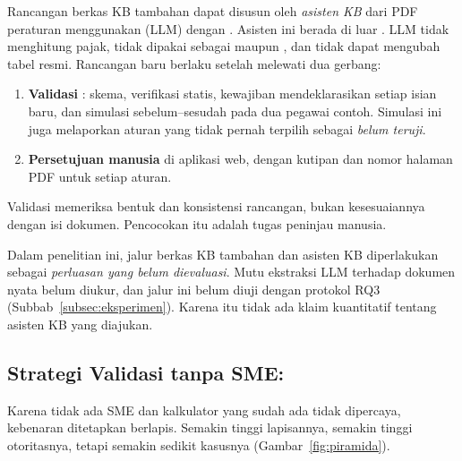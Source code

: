Rancangan berkas KB tambahan dapat disusun oleh \emph{asisten KB} dari PDF peraturan menggunakan  (LLM) dengan . Asisten ini berada di luar . LLM tidak menghitung pajak, tidak dipakai sebagai  maupun , dan tidak dapat mengubah tabel resmi. Rancangan baru berlaku setelah melewati dua gerbang:
\begin{enumerate}[leftmargin=*,nosep]
  \item \textbf{Validasi }: skema, verifikasi statis, kewajiban mendeklarasikan setiap isian baru, dan simulasi sebelum--sesudah pada dua pegawai contoh. Simulasi ini juga melaporkan aturan yang tidak pernah terpilih sebagai \emph{belum teruji}.
  \item \textbf{Persetujuan manusia} di aplikasi web, dengan kutipan dan nomor halaman PDF untuk setiap aturan.
\end{enumerate}
Validasi  memeriksa bentuk dan konsistensi rancangan, bukan kesesuaiannya dengan isi dokumen. Pencocokan itu adalah tugas peninjau manusia.

Dalam penelitian ini, jalur berkas KB tambahan dan asisten KB diperlakukan sebagai \emph{perluasan yang belum dievaluasi}. Mutu ekstraksi LLM terhadap dokumen nyata belum diukur, dan jalur ini belum diuji dengan protokol RQ3 (Subbab~\ref{subsec:eksperimen}). Karena itu tidak ada klaim kuantitatif tentang asisten KB yang diajukan.

\subsection{Strategi Validasi tanpa SME: }
\label{subsec:validasi}

Karena tidak ada SME dan kalkulator yang sudah ada tidak dipercaya, kebenaran ditetapkan berlapis. Semakin tinggi lapisannya, semakin tinggi otoritasnya, tetapi semakin sedikit kasusnya (Gambar~\ref{fig:piramida}).

